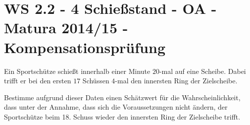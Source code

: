\section{WS 2.2 - 4 Schießstand - OA - Matura 2014/15 - Kompensationsprüfung}

\begin{beispiel}[WS 2.2]{1} %
				Ein Sportschütze schießt innerhalb einer Minute $20$-mal auf eine Scheibe. Dabei trifft er bei den ersten $17$ Schüssen $4$-mal den innersten Ring der Zielscheibe.
				
				Bestimme aufgrund dieser Daten einen Schätzwert für die Wahrscheinlichkeit, dass unter der Annahme, dass sich die Voraussetzungen nicht ändern, der Sportschütze beim 18. Schuss wieder den innersten Ring der Zielscheibe trifft.
				
\end{beispiel}